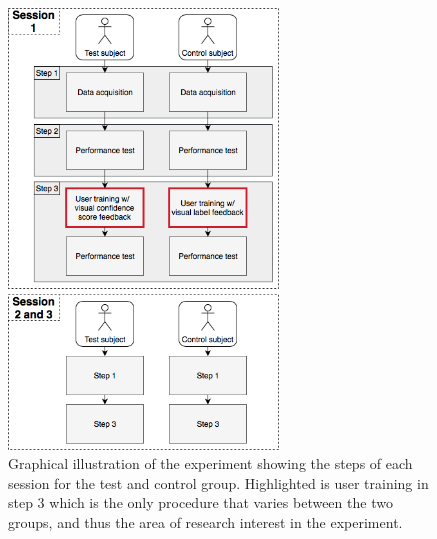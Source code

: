 \begin{figure}[H]                                         
	\includegraphics[width=0.64\textwidth]{figures/pMethods/Study_design}  
	\caption{Graphical illustration of the experiment showing the steps of each session for the test and control group. Highlighted is user training in step 3 which is the only procedure that varies between the two groups, and thus the area of research interest in the experiment.}
	\label{fig:std} 
\end{figure}   
